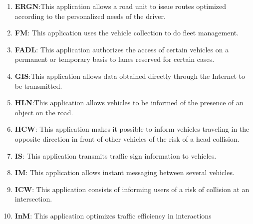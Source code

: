 \begin{enumerate}
\item \textbf{\acrfull{ERGN}}:This application allows a road unit to issue routes optimized according to the personalized needs of the driver. \cite{etsi_etsi_tr_102_638_intelligent_2009}
\item \textbf{\acrfull{FM}}: This application uses the vehicle collection to do fleet management. \cite{etsi_etsi_tr_102_638_intelligent_2009}
\item \textbf{\acrfull{FADL}}: This application authorizes the access of certain vehicles on a permanent or temporary basis to lanes reserved for certain cases. \cite{etsi_etsi_tr_102_638_intelligent_2009,brown_review_2019, hobert_enhancements_2015}
\item \textbf{\acrfull{GIS}}:This application allows data obtained directly through the Internet to be transmitted. \cite{karagiannis_vehicular_2011}
\item \textbf{\acrfull{HLN}}:This application allows vehicles to be informed of the presence of an object on the road. \cite{etsi_etsi_tr_102_638_intelligent_2009,papadimitratos_vehicular_2009,j_vehicle--vehicle_2014}
\item \textbf{\acrfull{HCW}}: This application makes it possible to inform vehicles traveling in the opposite direction in front of other vehicles of the risk of a head collision. \cite{karagiannis_vehicular_2011,chang_intelligent_2010,xiang_research_2014,usdt_intelligent_2021,ye_v2v_2008}
\item \textbf{\acrfull{IS}}: This application transmits traffic sign information to vehicles. \cite{etsi_etsi_tr_102_638_intelligent_2009}
\item \textbf{\acrfull{IM}}: This application allows instant messaging between several vehicles. \cite{etsi_etsi_tr_102_638_intelligent_2009}
\item \textbf{\acrfull{ICW}}: This application consists of informing users of a risk of collision at an intersection.\cite{etsi_etsi_tr_102_638_intelligent_2009,papadimitratos_vehicular_2009,j_vehicle--vehicle_2014,al-sultan_comprehensive_2014,karagiannis_vehicular_2011,araniti_lte_2013,gupta_medium_2015,abid_pedestrian_2013}
\item \textbf{\acrfull{InM}}: This application optimizes traffic efficiency in interactions \cite{etsi_etsi_tr_102_638_intelligent_2009,papadimitratos_vehicular_2009, hobert_enhancements_2015}

\end{enumerate}
